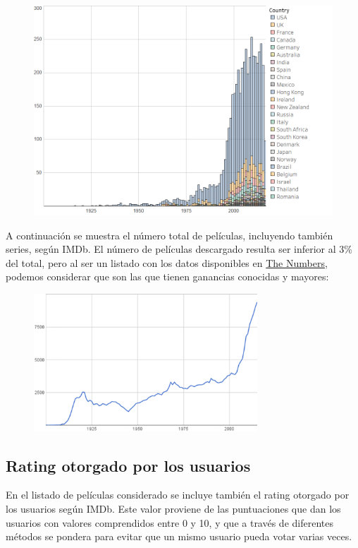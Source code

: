 \documentclass{article}
\begin{document}
\begin{figure}[h]
\centering
\includegraphics[width=4.5in,clip,keepaspectratio]{./images_latex/films_per_year.png}
\label{fig:kaggle_num_films_per_year}
\end{figure}

A continuación se muestra el número total de películas, incluyendo también series, según IMDb\cite{quora}. El número de películas descargado resulta ser inferior al 3\% del total, pero al ser un listado con los datos disponibles en \href{http://www.the-numbers.com/movie/budgets/all}{The Numbers}, podemos considerar que son las que tienen ganancias conocidas y mayores:

\begin{figure}[h]
\centering
\includegraphics[width=3.3in,clip,keepaspectratio]{./images_latex/total_movies_imdb}
\end{figure}

\subsection{Rating otorgado por los usuarios}

En el listado de películas considerado se incluye también el rating otorgado por los usuarios según IMDb. Este valor proviene de las puntuaciones que dan los usuarios con valores comprendidos entre 0 y 10, y que a través de diferentes métodos se pondera para evitar que un mismo usuario pueda votar varias veces.
\end{document}
